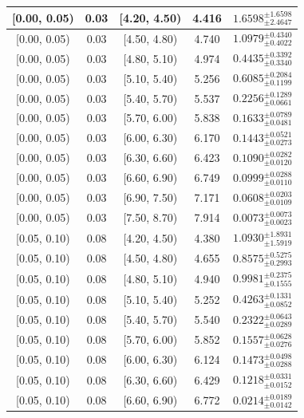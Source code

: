 \begin{longtable}{|c|c|c|c|c|}
\hline
\endlastfoot
[0.00, 0.05) & 0.03 & [4.20, 4.50) & 4.416 & $1.6598^{ \pm 1.6598 }_{ \pm 2.4647 }$ \\ 
\hline
[0.00, 0.05) & 0.03 & [4.50, 4.80) & 4.740 & $1.0979^{ \pm 0.4340 }_{ \pm 0.4022 }$ \\ 
\hline
[0.00, 0.05) & 0.03 & [4.80, 5.10) & 4.974 & $0.4435^{ \pm 0.3392 }_{ \pm 0.3340 }$ \\ 
\hline
[0.00, 0.05) & 0.03 & [5.10, 5.40) & 5.256 & $0.6085^{ \pm 0.2084 }_{ \pm 0.1199 }$ \\ 
\hline
[0.00, 0.05) & 0.03 & [5.40, 5.70) & 5.537 & $0.2256^{ \pm 0.1289 }_{ \pm 0.0661 }$ \\ 
\hline
[0.00, 0.05) & 0.03 & [5.70, 6.00) & 5.838 & $0.1633^{ \pm 0.0789 }_{ \pm 0.0481 }$ \\ 
\hline
[0.00, 0.05) & 0.03 & [6.00, 6.30) & 6.170 & $0.1443^{ \pm 0.0521 }_{ \pm 0.0273 }$ \\ 
\hline
[0.00, 0.05) & 0.03 & [6.30, 6.60) & 6.423 & $0.1090^{ \pm 0.0282 }_{ \pm 0.0120 }$ \\ 
\hline
[0.00, 0.05) & 0.03 & [6.60, 6.90) & 6.749 & $0.0999^{ \pm 0.0288 }_{ \pm 0.0110 }$ \\ 
\hline
[0.00, 0.05) & 0.03 & [6.90, 7.50) & 7.171 & $0.0608^{ \pm 0.0203 }_{ \pm 0.0109 }$ \\ 
\hline
[0.00, 0.05) & 0.03 & [7.50, 8.70) & 7.914 & $0.0073^{ \pm 0.0073 }_{ \pm 0.0023 }$ \\ 
\hline
[0.05, 0.10) & 0.08 & [4.20, 4.50) & 4.380 & $1.0930^{ \pm 1.8931 }_{ \pm 1.5919 }$ \\ 
\hline
[0.05, 0.10) & 0.08 & [4.50, 4.80) & 4.655 & $0.8575^{ \pm 0.5275 }_{ \pm 0.2993 }$ \\ 
\hline
[0.05, 0.10) & 0.08 & [4.80, 5.10) & 4.940 & $0.9981^{ \pm 0.2375 }_{ \pm 0.1555 }$ \\ 
\hline
[0.05, 0.10) & 0.08 & [5.10, 5.40) & 5.252 & $0.4263^{ \pm 0.1331 }_{ \pm 0.0852 }$ \\ 
\hline
[0.05, 0.10) & 0.08 & [5.40, 5.70) & 5.540 & $0.2322^{ \pm 0.0643 }_{ \pm 0.0289 }$ \\ 
\hline
[0.05, 0.10) & 0.08 & [5.70, 6.00) & 5.852 & $0.1557^{ \pm 0.0628 }_{ \pm 0.0276 }$ \\ 
\hline
[0.05, 0.10) & 0.08 & [6.00, 6.30) & 6.124 & $0.1473^{ \pm 0.0498 }_{ \pm 0.0288 }$ \\ 
\hline
[0.05, 0.10) & 0.08 & [6.30, 6.60) & 6.429 & $0.1218^{ \pm 0.0331 }_{ \pm 0.0152 }$ \\ 
\hline
[0.05, 0.10) & 0.08 & [6.60, 6.90) & 6.772 & $0.0214^{ \pm 0.0189 }_{ \pm 0.0142 }$ \\ 

\end{longtable}
